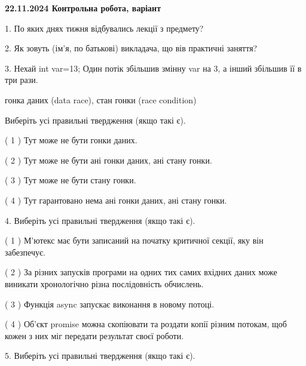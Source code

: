 \documentclass[12pt, ukrainian]{article}
\begin{document}
\vspace{4mm}
\newpage
\begin {large}

\textbf{22.11.2024 Контрольна робота, варіант  }\par


{
1. По яких днях тижня відбувались лекції з предмету?



\vspace{5mm}
2. Як зовуть (ім'я, по батькові) викладача, що вів практичні заняття?



\vspace{5mm}
3. Нехай int var=13; Один потік збільшив змінну var на 3, а інший збільшив її в три рази.

гонка даних (data race), стан гонки (race condition)

Виберіть усі правильні твердження (якщо такі є).\par
\vspace{2mm}
( 1 ) Тут може не бути гонки даних.%

( 2 ) Тут може не бути ані гонки даних, ані стану гонки.%

( 3 ) Тут може не бути стану гонки.%

( 4 ) Тут гарантовано нема ані гонки даних, ані стану гонки.%


\vspace{5mm}
4. Виберіть усі правильні твердження (якщо такі є).\par
\vspace{2mm}

( 1 ) М’ютекс має бути записаний на початку критичної секції, яку він забезпечує.%

( 2 ) За різних запусків програми на одних тих самих вхідних даних може виникати хронологічно різна послідовність обчислень.%

( 3 ) Функція async запускає виконання в новому потоці.%

( 4 ) Об’єкт promise можна скопіювати та роздати копії різним потокам, щоб кожен з них міг передати результат своєї роботи.%


\vspace{5mm}
5. Виберіть усі правильні твердження (якщо такі є).\par
\vspace{2mm}

}
\end{large}
\end{document}
